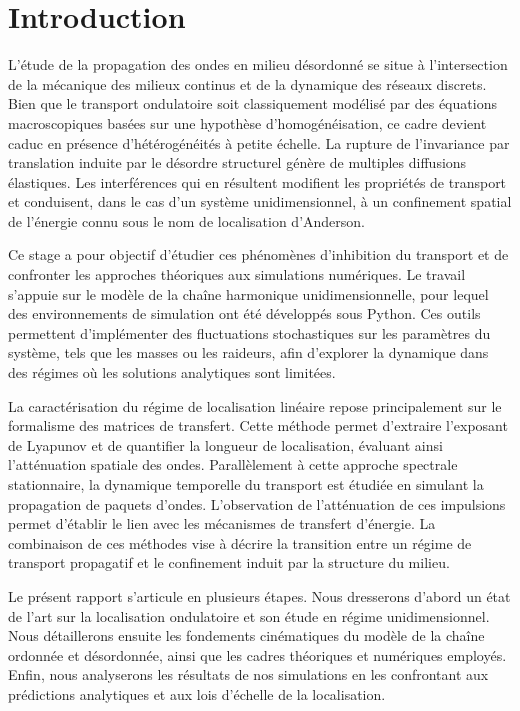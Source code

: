 \chapter*{Introduction}

L'étude de la propagation des ondes en milieu désordonné se situe à l'intersection de la mécanique des milieux continus et de la dynamique des réseaux discrets. Bien que le transport ondulatoire soit classiquement modélisé par des équations macroscopiques basées sur une hypothèse d'homogénéisation, ce cadre devient caduc en présence d'hétérogénéités à petite échelle. La rupture de l'invariance par translation induite par le désordre structurel génère de multiples diffusions élastiques. Les interférences qui en résultent modifient les propriétés de transport et conduisent, dans le cas d'un système unidimensionnel, à un confinement spatial de l'énergie connu sous le nom de localisation d'Anderson.

Ce stage a pour objectif d'étudier ces phénomènes d'inhibition du transport et de confronter les approches théoriques aux simulations numériques. Le travail s'appuie sur le modèle de la chaîne harmonique unidimensionnelle, pour lequel des environnements de simulation ont été développés sous Python. Ces outils permettent d'implémenter des fluctuations stochastiques sur les paramètres du système, tels que les masses ou les raideurs, afin d'explorer la dynamique dans des régimes où les solutions analytiques sont limitées.

La caractérisation du régime de localisation linéaire repose principalement sur le formalisme des matrices de transfert. Cette méthode permet d'extraire l'exposant de Lyapunov et de quantifier la longueur de localisation, évaluant ainsi l'atténuation spatiale des ondes. Parallèlement à cette approche spectrale stationnaire, la dynamique temporelle du transport est étudiée en simulant la propagation de paquets d'ondes. L'observation de l'atténuation de ces impulsions permet d'établir le lien avec les mécanismes de transfert d'énergie. La combinaison de ces méthodes vise à décrire la transition entre un régime de transport propagatif et le confinement induit par la structure du milieu.

Le présent rapport s'articule en plusieurs étapes. Nous dresserons d'abord un état de l'art sur la localisation ondulatoire et son étude en régime unidimensionnel. Nous détaillerons ensuite les fondements cinématiques du modèle de la chaîne ordonnée et désordonnée, ainsi que les cadres théoriques et numériques employés. Enfin, nous analyserons les résultats de nos simulations en les confrontant aux prédictions analytiques et aux lois d'échelle de la localisation.